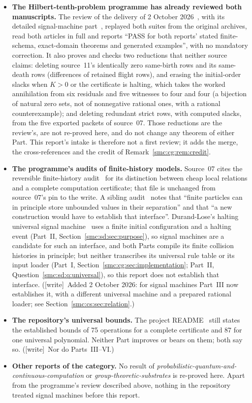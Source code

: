 \documentclass[11pt,letterpaper]{article}
\numberwithin{equation}{section}
\theoremstyle{definition}
\theoremstyle{remark}
\newcommand{\wtag}{\textup{[write]}}
\begin{document}
\begin{itemize}
\item \textbf{The Hilbert-tenth-problem programme has already reviewed both manuscripts.} The review of the delivery of 2 October 2026~\cite{review808}, with its detailed signal-machine part~\cite{reviewsignal}, replayed both suites from the original archives, read both articles in full and reports ``PASS for both reports' stated finite-schema, exact-domain theorems and generated examples'', with no mandatory correction. It also proves and checks two reductions that neither source claims: deleting source~11's identically zero same-birth rows and its same-death rows (differences of retained flight rows), and erasing the initial-order slacks when $K>0$ or the certificate is halting, which takes the worked annihilation from six residuals and five witnesses to four and four (a bijection of natural zero sets, not of nonnegative rational ones, with a rational counterexample); and deleting redundant strict rows, with computed slacks, from the five exported packets of source~07. Those reductions are the review's, are not re-proved here, and do not change any theorem of either Part. This report's intake is therefore not a first review; it adds the merge, the cross-references and the credit of Remark~\ref{smc:cg:rem:credit}.
\item \textbf{The programme's audits of finite-history models.} Source~07 cites the reversible finite-history audit~\cite{reversible} for its distinction between cheap local relations and a complete computation certificate; that file is unchanged from source~07's pin to the write. A sibling audit~\cite{blockca} notes that ``finite particles can in principle store unbounded values in their separation'' and that ``a new construction would have to establish that interface''. Durand-Lose's halting universal signal machine~\cite{durandlose} uses a finite initial configuration and a halting event (Part~II, Section~\ref{smc:sd:sec:purpose}), so signal machines are a candidate for such an interface, and both Parts compile its finite collision histories in principle; but neither transcribes its universal rule table or its input loader (Part~I, Section~\ref{smc:cg:sec:implementation}; Part~II, Question~\ref{smc:sd:q:universal}), so this report does not establish that interface. (\wtag\ Added 2 October 2026: for signal machines Part~III now establishes it, with a different universal machine and a prepared rational loader; see Section~\ref{smc:cs:sec:relation}.)
\item \textbf{The repository's universal bounds.} The project README~\cite{repo} still states the established bounds of 75 operations for a complete certificate and 87 for one universal polynomial. Neither Part improves or bears on them; both say so. (\wtag\ Nor do Parts~III--VI.)
\item \textbf{Other reports of the category.} No result of \emph{probabilistic-quantum-and-continuous-computation} or \emph{group-theoretic-substrates} is re-proved here. Apart from the programme's review described above, nothing in the repository treated signal machines before this report.
\end{itemize}
\end{document}
